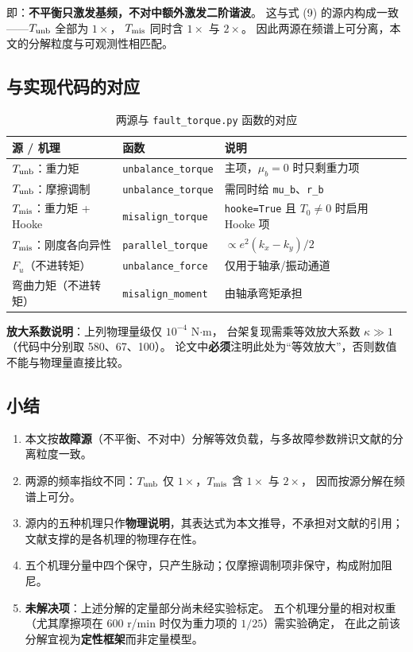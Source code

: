 \documentclass[11pt,a4paper]{ctexart}
\begin{document}
\noindent
即：\textbf{不平衡只激发基频，不对中额外激发二阶谐波}。
这与式 (9) 的源内构成一致——\(T_{\rm unb}\) 全部为 \(1\times\)，
\(T_{\rm mis}\) 同时含 \(1\times\) 与 \(2\times\)。
因此两源在频谱上可分离，本文的分解粒度与可观测性相匹配。

\subsection{与实现代码的对应}

\begin{table}[h]
\centering
\caption{两源与 \texttt{fault\_torque.py} 函数的对应}
\small
\begin{tabular}{@{}llp{5.4cm}@{}}
\toprule
源 / 机理 & 函数 & 说明 \\
\midrule
\(T_{\rm unb}\)：重力矩 & \texttt{unbalance\_torque} & 主项，\(\mu_b=0\) 时只剩重力项 \\
\(T_{\rm unb}\)：摩擦调制 & \texttt{unbalance\_torque} & 需同时给 \texttt{mu\_b}、\texttt{r\_b} \\
\(T_{\rm mis}\)：重力矩 + Hooke & \texttt{misalign\_torque} & \texttt{hooke=True} 且 \(T_0\neq0\) 时启用 Hooke 项 \\
\(T_{\rm mis}\)：刚度各向异性 & \texttt{parallel\_torque} & \(\propto e^2(k_x-k_y)/2\) \\
\(F_u\)（不进转矩） & \texttt{unbalance\_force} & 仅用于轴承/振动通道 \\
弯曲力矩（不进转矩） & \texttt{misalign\_moment} & 由轴承弯矩承担 \\
\bottomrule
\end{tabular}
\end{table}

\noindent
\textbf{放大系数说明}：上列物理量级仅 \(10^{-4}\) N\(\cdot\)m，
台架复现需乘等效放大系数 \(\kappa\gg1\)（代码中分别取 580、67、100）。
论文中\textbf{必须}注明此处为“等效放大”，否则数值不能与物理量直接比较。

\subsection{小结}

\begin{enumerate}[label=(\arabic*)]
\item 本文按\textbf{故障源}（不平衡、不对中）分解等效负载，与多故障参数辨识文献的分离粒度一致。
\item 两源的频率指纹不同：\(T_{\rm unb}\) 仅 \(1\times\)，\(T_{\rm mis}\) 含 \(1\times\) 与 \(2\times\)，
  因而按源分解在频谱上可分。
\item 源内的五种机理只作\textbf{物理说明}，其表达式为本文推导，不承担对文献的引用；
  文献支撑的是各机理的物理存在性。
\item 五个机理分量中四个保守，只产生脉动；仅摩擦调制项非保守，构成附加阻尼。
\item \textbf{未解决项}：上述分解的定量部分尚未经实验标定。
  五个机理分量的相对权重（尤其摩擦项在 \(600\) r/min 时仅为重力项的 \(1/25\)）需实验确定，
  在此之前该分解宜视为\textbf{定性框架}而非定量模型。
\end{enumerate}
\end{document}
